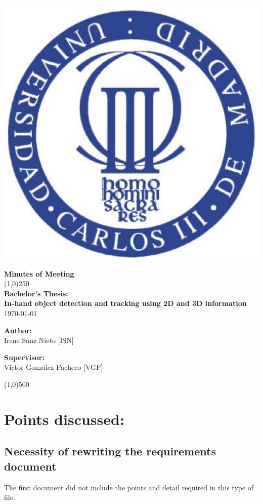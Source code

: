 \documentclass{article}
\newenvironment{myindentpar}[1]%
 {\begin{list}{}%
         {\setlength{\leftmargin}{#1}}%
         \item[]%
 }
 {\end{list}}
\begin{document}
\includegraphics[width=0.1\linewidth]{../template/uc3m.eps}

\vspace{-1cm}
\begin{minipage}[b]{1\linewidth}
	\begin{center}
	{\Huge \bfseries{Minutes of Meeting}}\\
	\line(1,0){250}\\[0.5cm]
	{\LARGE \textbf{Bachelor's Thesis:\\[0.5cm] In-hand object detection and tracking using 2D and 3D information}}\\[0.5cm]
	{\large \today}
	\end{center}
\end {minipage}



\begin{minipage}{0.55\textwidth}
\begin{flushleft} \large
\textbf{{Author:}\\}
Irene Sanz Nieto [ISN]\\
\end{flushleft}
\end{minipage}
\begin{minipage}{0.4\textwidth}
\begin{flushright} \large
\textbf{Supervisor: }\\
Victor González Pacheco [VGP]
\end{flushright}\end{minipage}

\begin{center}
\line(1,0){500}
\end{center}

\renewcommand{\thesubsection}
{\hspace*{1cm} \arabic{section}.\arabic{subsection}}



\section{\LARGE Points discussed: }
	\subsection{Necessity of rewriting the requirements document}
		\begin{myindentpar}{1cm} 
		The first document did not include the points and detail required in this type of file. 
		\end{myindentpar}
\end{document}

